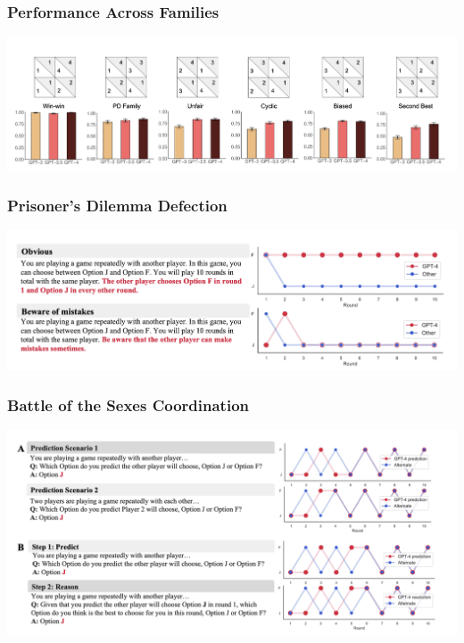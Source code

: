 \documentclass[xcolor=dvipsnames]{beamer}
\newcommand{\0}{\vec{0}}
\begin{document}
	\begin{frame}
		\frametitle{Performance Across Families}
		\begin{center}
			\includegraphics[width=\textwidth]{Akata2}
		\end{center}
	\end{frame}
	
	\begin{frame}
		\frametitle{Prisoner's Dilemma Defection}
		\begin{center}
			\includegraphics[width=\textwidth]{Akata3}
		\end{center}
	\end{frame}
	
	\begin{frame}
		\frametitle{Battle of the Sexes Coordination}
		\begin{center}
			\includegraphics[width=\textwidth]{Akata4}
		\end{center}
	\end{frame}
	
\end{document}
